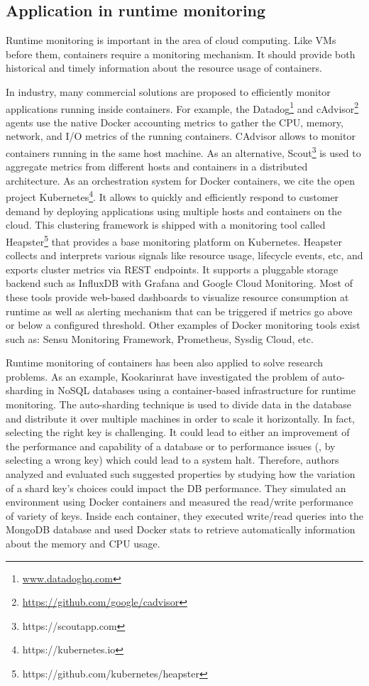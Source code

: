 \subsection{Application in runtime monitoring} 
Runtime monitoring is important in the area of cloud computing\cite{aceto2013cloud}. Like VMs before them, containers require a monitoring mechanism. It should provide both historical and timely information about the resource usage of containers.

In industry, many commercial solutions are proposed to efficiently monitor applications running inside containers. For example, the Datadog\footnote{\url{www.datadoghq.com}} and cAdvisor\footnote{\url{https://github.com/google/cadvisor}} agents use the native Docker accounting metrics to gather the CPU, memory, network, and I/O metrics of the running containers. CAdvisor allows to monitor containers running in the same host machine. As an alternative, Scout\footnote{https://scoutapp.com} is used to aggregate metrics from different hosts and containers in a distributed architecture.
As an orchestration system for Docker containers, we cite the open project Kubernetes\footnote{https://kubernetes.io}. It allows to quickly and efficiently respond to customer demand by deploying applications using multiple hosts and containers on the cloud. This clustering framework is shipped with a monitoring tool called Heapster\footnote{https://github.com/kubernetes/heapster} that provides a base monitoring platform on Kubernetes. Heapster collects and interprets various signals like resource usage, lifecycle events, etc, and exports cluster metrics via REST endpoints. It supports a pluggable storage backend such as InfluxDB with Grafana and Google Cloud Monitoring.
Most of these tools provide web-based dashboards to visualize resource consumption at runtime as well as alerting mechanism that can be triggered if metrics go above or below a configured threshold. Other examples of Docker monitoring tools exist such as: Sensu Monitoring Framework, Prometheus, Sysdig Cloud, etc.

Runtime monitoring of containers has been also applied to solve research problems. As an example, Kookarinrat \etal\cite{kookarinrat2015analysis} have investigated the problem of auto-sharding in NoSQL databases using a container-based infrastructure for runtime monitoring. 
The auto-sharding technique is used to divide data in the database and distribute it over multiple machines in order to scale it horizontally. In fact, selecting the right key is challenging. It could lead to either an improvement of the performance and capability of a database or to performance issues (\ie, by selecting a wrong key) which could lead to a system halt. 
Therefore, authors analyzed and evaluated such suggested properties by studying how the variation of a shard key’s choices could impact the DB performance.
They simulated an environment using Docker containers and measured the read/write performance of variety of keys. Inside each container, they executed write/read queries into the MongoDB database and used Docker stats to retrieve automatically information about the memory and CPU usage.


